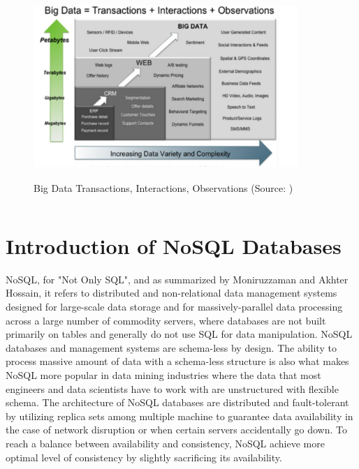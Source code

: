 \begin{figure}[H]
	\includegraphics[height=7cm, width=10cm]{../../images/bigdata.png}
	\caption{Big Data Transactions, Interactions, Observations (Source: \cite{DBLP:journals/corr/MoniruzzamanH13})}
\end{figure}


\[\]


\section{Introduction of NoSQL Databases}

NoSQL, for "Not Only SQL", and as summarized by Moniruzzaman and Akhter Hossain\cite{DBLP:journals/corr/MoniruzzamanH13}, it refers to distributed and non-relational data management systems designed for large-scale data
storage and for massively-parallel data processing across a large number of commodity
servers, where databases are not built primarily on tables and generally do not use SQL for data manipulation. 
NoSQL databases and management systems are schema-less by design. The ability to process massive amount of data with a schema-less structure is also what makes NoSQL more popular in data mining industries where the data that most engineers and data scientists have to work with are  unstructured with flexible schema.
The architecture of NoSQL databases are distributed and fault-tolerant by utilizing replica sets among multiple machine to 
guarantee data availability in the case of network disruption or when certain servers accidentally go down.
To reach a
balance between availability and consistency, NoSQL achieve more optimal
level of consistency by slightly sacrificing its availability.  \\


